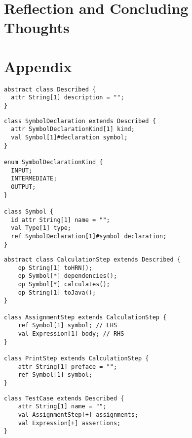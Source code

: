 \documentclass[11pt,fleqn]{article}
\begin{document}
\section{Reflection and Concluding Thoughts}
\label{sec:reflection-and-concluding-thoughts}

\newpage{}

\printbibliography[heading=bibintoc]

\newpage{}

\section*{Appendix}
\label{sec:appendix}

\begin{lstlisting}[caption={Abstract Class: Described},label={lst:described}]
abstract class Described {
  attr String[1] description = "";
}
\end{lstlisting}

\begin{lstlisting}[caption={Symbol Declarations},label={lst:symbol-declarations}]
class SymbolDeclaration extends Described {
  attr SymbolDeclarationKind[1] kind;
  val Symbol[1]#declaration symbol;
}

enum SymbolDeclarationKind {
  INPUT;
  INTERMEDIATE;
  OUTPUT;
}

class Symbol {
  id attr String[1] name = "";
  val Type[1] type;
  ref SymbolDeclaration[1]#symbol declaration;
}
\end{lstlisting}

\begin{lstlisting}[caption={Calculation Steps},label={lst:calculation-steps}]
abstract class CalculationStep extends Described {
	op String[1] toHRN();
	op Symbol[*] dependencies();
	op Symbol[*] calculates();
	op String[1] toJava();
}

class AssignmentStep extends CalculationStep {
	ref Symbol[1] symbol; // LHS
	val Expression[1] body; // RHS
}

class PrintStep extends CalculationStep {
	attr String[1] preface = "";
	ref Symbol[1] symbol;
}
\end{lstlisting}

\begin{lstlisting}[caption={Test Case},label={lst:test-case}]
class TestCase extends Described {
	attr String[1] name = "";
	val AssignmentStep[+] assignments;
	val Expression[+] assertions;
}
\end{lstlisting}
\end{document}
